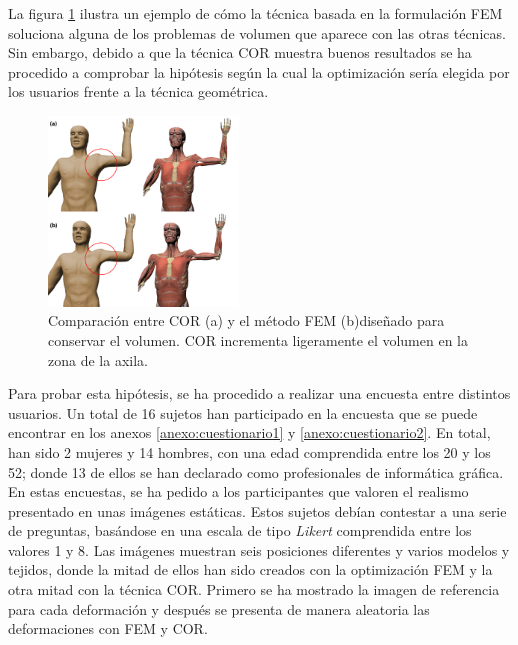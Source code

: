 La figura \ref{fig:anatomium} ilustra un ejemplo de cómo la técnica basada en la formulación \ac{FEM} soluciona alguna de los problemas de volumen que aparece con las otras técnicas. Sin embargo, debido a que la técnica \ac{COR} muestra buenos resultados se ha procedido a comprobar la hipótesis según la cual la optimización sería elegida por los usuarios frente a la técnica geométrica.
 
\begin{figure}[h]%
   \centering
   \includegraphics[width=0.45\textwidth]{IMG/AntCOR}
    \caption{ Comparación entre \ac{COR} (a) y el método \ac{FEM} (b)diseñado para conservar el volumen. \ac{COR} incrementa ligeramente el volumen en la zona de la axila.}
    \label{fig:anatomium}
\end{figure}
 
Para probar esta hipótesis, se ha procedido a realizar una encuesta entre distintos usuarios. Un total de 16 sujetos han participado en la encuesta que se puede encontrar en los anexos \ref{anexo:cuestionario1} y \ref{anexo:cuestionario2}. En total, han sido 2 mujeres y 14 hombres, con una edad comprendida entre los 20 y los 52; donde 13 de ellos se han declarado como profesionales de informática gráfica. En estas encuestas, se ha pedido a los participantes que valoren el realismo presentado en unas imágenes estáticas. Estos sujetos debían contestar a una serie de preguntas, basándose en una escala de tipo  \emph{Likert} comprendida entre los valores 1 y 8. Las imágenes muestran seis posiciones diferentes y varios modelos y tejidos, donde la mitad de ellos han sido creados con la optimización \ac{FEM} y la otra mitad con la técnica \ac{COR}. Primero se ha mostrado la imagen de referencia para cada deformación y después se presenta de manera aleatoria las deformaciones con \ac{FEM} y \ac{COR}.

%

